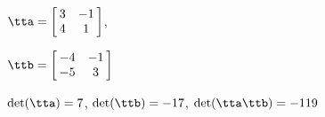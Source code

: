 {$\tta = \left[\hskip -3pt \begin{array}{cc} 3&-1\\  4&1\end {array} \hskip -3pt
 \right]$, 

$\ttb = \left[\hskip -3pt \begin{array}{cc} -4&-1\\  -5&3\end {array} \hskip -3pt
 \right]$}
{$\det(\tta)=7$, $\det(\ttb)=-17$, $\det(\tta\ttb)=-119$}






  

